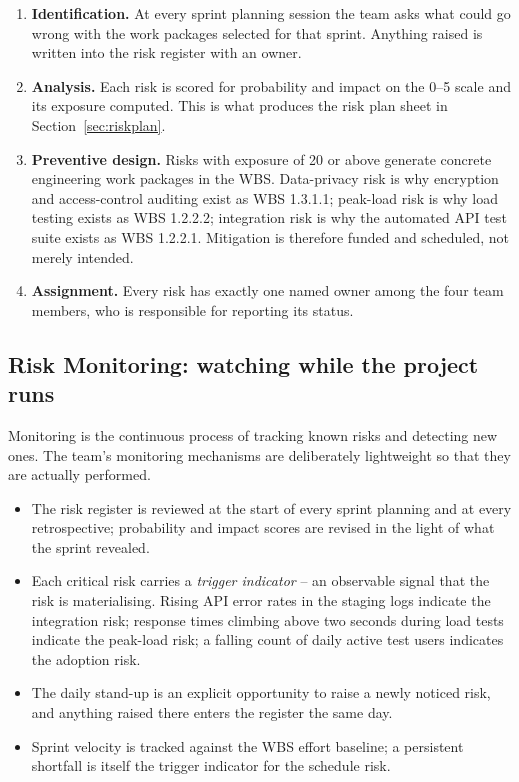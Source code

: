 \documentclass[11pt,a4paper]{report}
\begin{document}
\begin{enumerate}
  \item \textbf{Identification.} At every sprint planning session the team asks
  what could go wrong with the work packages selected for that sprint. Anything
  raised is written into the risk register with an owner.
  \item \textbf{Analysis.} Each risk is scored for probability and impact on the
  0--5 scale and its exposure computed. This is what produces the risk plan
  sheet in Section~\ref{sec:riskplan}.
  \item \textbf{Preventive design.} Risks with exposure of 20 or above generate
  concrete engineering work packages in the WBS. Data-privacy risk is why
  encryption and access-control auditing exist as WBS 1.3.1.1; peak-load risk is
  why load testing exists as WBS 1.2.2.2; integration risk is why the automated
  API test suite exists as WBS 1.2.2.1. Mitigation is therefore funded and
  scheduled, not merely intended.
  \item \textbf{Assignment.} Every risk has exactly one named owner among the
  four team members, who is responsible for reporting its status.
\end{enumerate}

\subsection{Risk Monitoring: watching while the project runs}

Monitoring is the continuous process of tracking known risks and detecting new
ones. The team's monitoring mechanisms are deliberately lightweight so that they
are actually performed.

\begin{itemize}
  \item The risk register is reviewed at the start of every sprint planning and
  at every retrospective; probability and impact scores are revised in the light
  of what the sprint revealed.
  \item Each critical risk carries a \emph{trigger indicator} -- an observable
  signal that the risk is materialising. Rising API error rates in the staging
  logs indicate the integration risk; response times climbing above two seconds
  during load tests indicate the peak-load risk; a falling count of daily active
  test users indicates the adoption risk.
  \item The daily stand-up is an explicit opportunity to raise a newly noticed
  risk, and anything raised there enters the register the same day.
  \item Sprint velocity is tracked against the WBS effort baseline; a persistent
  shortfall is itself the trigger indicator for the schedule risk.
\end{itemize}
\end{document}

